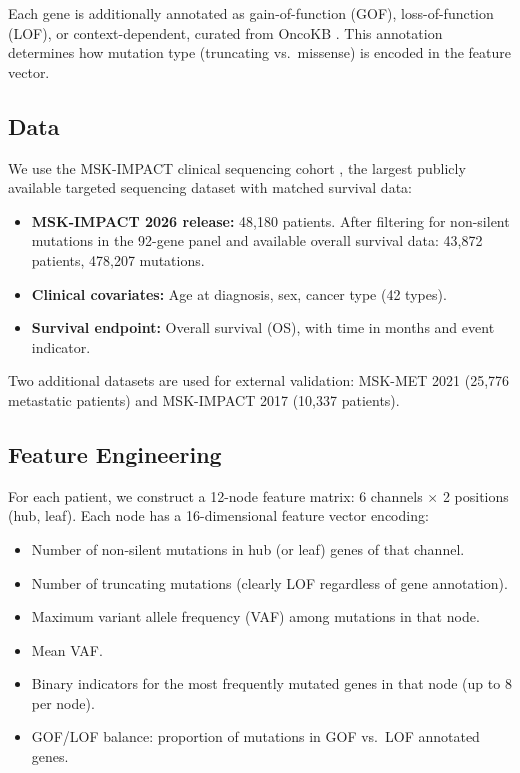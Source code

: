 \documentclass[11pt]{article}
\begin{document}
Each gene is additionally annotated as gain-of-function (GOF),
loss-of-function (LOF), or context-dependent, curated from
OncoKB \cite{Chakravarty2017}. This annotation determines how
mutation type (truncating vs.\ missense) is encoded in the
feature vector.

\subsection{Data}

We use the MSK-IMPACT clinical sequencing cohort
\cite{Zehir2017}, the largest publicly available targeted
sequencing dataset with matched survival data:

\begin{itemize}
\item \textbf{MSK-IMPACT 2026 release:} 48{,}180 patients.
   After filtering for non-silent mutations in the 92-gene panel
   and available overall survival data: 43{,}872 patients, 478{,}207
   mutations.
\item \textbf{Clinical covariates:} Age at diagnosis, sex,
   cancer type (42 types).
\item \textbf{Survival endpoint:} Overall survival (OS), with
   time in months and event indicator.
\end{itemize}

Two additional datasets are used for external validation:
MSK-MET 2021 \cite{Nguyen2022} (25{,}776 metastatic patients)
and MSK-IMPACT 2017 \cite{Zehir2017} (10{,}337 patients).

\subsection{Feature Engineering}

For each patient, we construct a 12-node feature matrix:
6 channels $\times$ 2 positions (hub, leaf). Each node has a
16-dimensional feature vector encoding:

\begin{itemize}
\item Number of non-silent mutations in hub (or leaf) genes of
   that channel.
\item Number of truncating mutations (clearly LOF regardless of
   gene annotation).
\item Maximum variant allele frequency (VAF) among mutations in
   that node.
\item Mean VAF.
\item Binary indicators for the most frequently mutated genes in
   that node (up to 8 per node).
\item GOF/LOF balance: proportion of mutations in GOF vs.\ LOF
   annotated genes.
\end{itemize}
\end{document}
